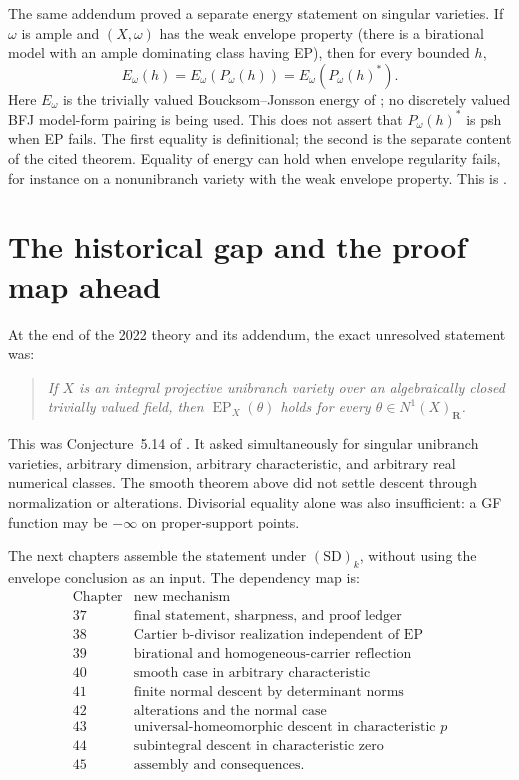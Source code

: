 The same addendum proved a separate energy statement on singular varieties.
If $\omega$ is ample and $(X,\omega)$ has the weak envelope property
(there is a birational model with an ample dominating class having EP), then
for every bounded $h$,
\[
E_\omega(h)=E_\omega(P_\omega(h))
             =E_\omega(P_\omega(h)^*).
\tag{36.11}\label{eq:addendum-energy-envelope}
\]
Here $E_\omega$ is the trivially valued Boucksom--Jonsson energy of
\cite{BJ22,BJ22b}; no discretely valued BFJ model-form pairing is being
used.
This does not assert that $P_\omega(h)^*$ is psh when EP fails.  The first equality is definitional; the second is the separate content of
the cited theorem. Equality of energy can hold when envelope regularity
fails, for instance on a nonunibranch variety with the weak envelope
property.
This is \cite[Theorem~B]{BJ22b}.

\section{The historical gap and the proof map ahead}

At the end of the 2022 theory and its addendum, the exact unresolved
statement was:

\begin{quote}
\emph{If $X$ is an integral projective unibranch variety over an
algebraically closed trivially valued field, then
$\operatorname{EP}_X(\theta)$ holds for every
$\theta\in N^1(X)_{\mathbf R}$.}
\end{quote}

This was Conjecture~5.14 of \cite{BJ22}.  It asked simultaneously for
singular unibranch varieties, arbitrary dimension, arbitrary characteristic,
and arbitrary real numerical classes.  The smooth theorem above did not
settle descent through normalization or alterations.  Divisorial equality
alone was also insufficient: a GF function may be $-\infty$ on
proper-support points.

The next chapters assemble the statement under $\mathrm{(SD)}_k$, without
using the envelope conclusion as an input. The
dependency map is:
\[
\begin{array}{c|l}
\text{Chapter}&\text{new mechanism}\\ \hline
37&\text{final statement, sharpness, and proof ledger}\\
38&\text{Cartier b-divisor realization independent of EP}\\
39&\text{birational and homogeneous-carrier reflection}\\
40&\text{smooth case in arbitrary characteristic}\\
41&\text{finite normal descent by determinant norms}\\
42&\text{alterations and the normal case}\\
43&\text{universal-homeomorphic descent in characteristic $p$}\\
44&\text{subintegral descent in characteristic zero}\\
45&\text{assembly and consequences}.
\end{array}
\]

